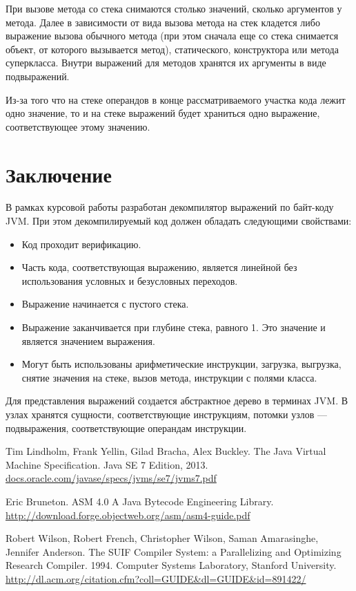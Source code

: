 \documentclass[14pt]{extarticle}
\begin{document}
При вызове метода со стека снимаются столько значений, сколько аргументов у метода. Далее в зависимости от вида вызова метода на стек кладется либо выражение вызова обычного метода (при этом сначала еще со стека снимается объект, от которого вызывается метод), статического, конструктора или метода суперкласса. Внутри выражений для методов хранятся их аргументы в виде подвыражений.

Из-за того что на стеке операндов в конце рассматриваемого участка кода лежит одно значение, то и на стеке выражений будет храниться одно выражение, соответствующее этому значению.

\pagebreak
\section*{Заключение}

В рамках курсовой работы разработан декомпилятор выражений по байт-коду JVM. При этом декомпилируемый код должен обладать следующими свойствами:
\begin{itemize}
\item Код проходит верификацию.
\item Часть кода, соответствующая выражению, является линейной без использования условных и безусловных переходов.
\item Выражение начинается с пустого стека.
\item Выражение заканчивается при глубине стека, равного 1. Это значение и является значением выражения.
\item Могут быть использованы арифметические инструкции, загрузка, выгрузка, снятие значения на стеке, вызов метода, инструкции с полями класса. 
\end{itemize}
Для представления выражений создается абстрактное дерево в терминах JVM. В узлах хранятся сущности, соответствующие инструкциям, потомки узлов --- подвыражения, соответствующие операндам инструкции.

\pagebreak

%

\begin{thebibliography}{}
Tim Lindholm, Frank Yellin, Gilad Bracha, Alex Buckley.
The Java Virtual Machine Specification.
Java SE 7 Edition, 2013. \\
\url{docs.oracle.com/javase/specs/jvms/se7/jvms7.pdf}

Eric Bruneton.
ASM 4.0 A Java Bytecode Engineering Library. \\
\url{http://download.forge.objectweb.org/asm/asm4-guide.pdf}

Robert Wilson, Robert French, Christopher Wilson, Saman Amarasinghe, Jennifer Anderson. The SUIF Compiler System: a Parallelizing and Optimizing Research Compiler. 1994. Computer Systems Laboratory, Stanford University. \\ \url {http://dl.acm.org/citation.cfm?coll=GUIDE&dl=GUIDE&id=891422/}
\end{thebibliography}
\end{document}

